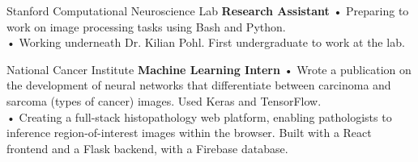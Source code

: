 {Stanford Computational Neuroscience Lab}
{\textbf{Research Assistant}}
{• Preparing to work on image processing tasks using Bash and Python.\\
• Working underneath Dr. Kilian Pohl. First undergraduate to work at the lab.
}

{National Cancer Institute}
{\textbf{Machine Learning Intern}}
{• Wrote a publication on the development of neural networks that differentiate between carcinoma and sarcoma (types of cancer) images. Used Keras and TensorFlow.\\
• Creating a full-stack histopathology web platform, enabling pathologists to inference region-of-interest images within the browser. Built with a React frontend and a Flask backend, with a Firebase database.
}